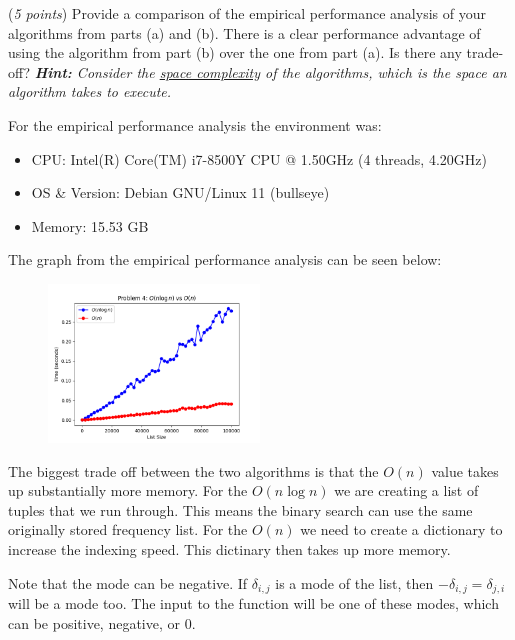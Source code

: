 \documentclass{hw}
\begin{document}
\begin{problem}
    \begin{subproblem}
        (\textit{5 points})
        Provide a comparison of the empirical performance analysis of your algorithms from parts (a) and (b). There is a clear performance advantage of using the algorithm from part (b) over the one from part (a). Is there any trade-off? \textit{\textbf{Hint:} Consider the \href{https://en.wikipedia.org/wiki/Space_complexity}{space complexity} of the algorithms, which is the space an algorithm takes to execute.}
    \end{subproblem}

    \begin{solution}
        For the empirical performance analysis the environment was:
        \begin{itemize}
            \item CPU: Intel(R) Core(TM) i7-8500Y CPU @ 1.50GHz (4 threads, 4.20GHz)
            \item OS \& Version: Debian GNU/Linux 11 (bullseye)
            \item Memory: 15.53 GB
        \end{itemize}
            
        The graph from the empirical performance analysis can be seen below:
        \begin{figure}[ht]
          \centering
              \includegraphics[width=0.5\textwidth]{figures/problem-4.png}
        \end{figure}

        The biggest trade off between the two algorithms is that the $O(n)$ value takes up substantially more memory. For the $O(n \log n)$ we are creating a list of tuples that we run through. This means the binary search can use the same originally stored frequency list. For the $O(n)$ we need to create a dictionary to increase the indexing speed. This dictinary then takes up more memory.
    \end{solution}
    
    Note that the mode can be negative. If $\delta_{i, j}$ is a mode of the list, then $-\delta_{i, j} = \delta_{j, i}$ will be a mode too. The input to the function will be one of these modes, which can be positive, negative, or 0.
\end{problem}
\end{document}
